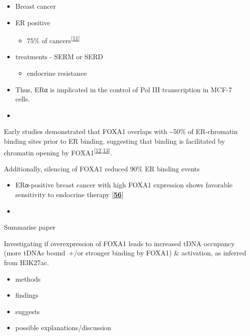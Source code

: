 \documentclass[
  12pt,
]{article}
\providecommand{\tightlist}{%
  \setlength{\itemsep}{0pt}\setlength{\parskip}{0pt}}
\begin{document}
\begin{itemize}
\item
  Breast cancer
\item
  ER positive

  \begin{itemize}
  \tightlist
  \item
    75\% of cancers\textsuperscript{{[}\protect\hyperlink{ref-allred2004}{11}{]}}
  \end{itemize}
\item
  treatments - SERM or SERD

  \begin{itemize}
  \tightlist
  \item
    endocrine resistance
  \end{itemize}
\item
  Thus, ERα is implicated in the control of Pol III transcription in MCF-7 cells.
\item
\end{itemize}

Early studies demonstrated that FOXA1 overlaps with \textasciitilde50\% of ER-chromatin binding sites prior to ER binding, suggesting that binding is facilitated by chromatin opening by FOXA1\textsuperscript{{[}\protect\hyperlink{ref-carroll2005}{12},\protect\hyperlink{ref-laganiuxe8re2005}{13}{]}}.

Additionally, silencing of FOXA1 reduced 90\% ER binding events

\begin{itemize}
\item
  ERα-positive breast cancer with high FOXA1 expression shows favorable sensitivity to endocrine therapy {[}\href{https://www.mdpi.com/2072-6694/9/3/22\#B56-cancers-09-00022}{\textbf{56}}{]}
\item
\end{itemize}

Summarise paper

Investigating if overexpression of FOXA1 leads to increased tDNA occupancy (more tDNAs bound~+/or stronger binding by FOXA1) \& activation, as inferred from H3K27ac.

\begin{itemize}
\item
  methods
\item
  findings
\item
  suggests
\item
  possible explanations/discussion
\end{itemize}
\end{document}
